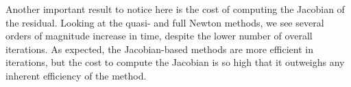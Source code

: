 Another important result to notice here is the cost of computing the Jacobian of the residual.
%
Looking at the quasi- and full Newton methods, we see several orders of magnitude increase in time, despite the lower number of overall iterations.
%
As expected, the Jacobian-based methods are more efficient in iterations, but the cost to compute the Jacobian is so high that it outweighs any inherent efficiency of the method.

